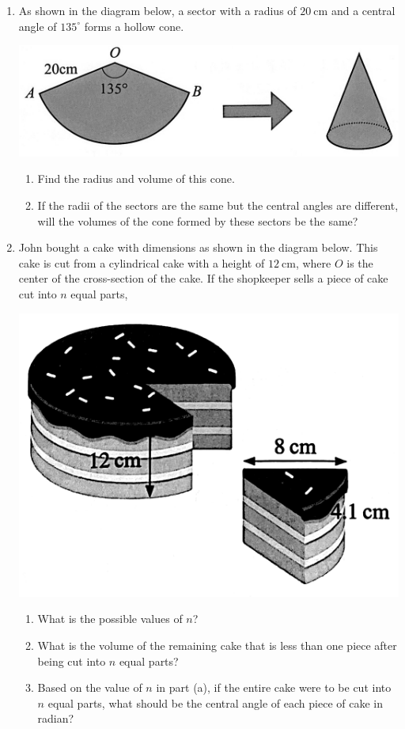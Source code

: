 \documentclass{report}
\begin{document}
\begin{enumerate}
    \newpage
    \item As shown in the diagram below, a sector with a radius of $20 \mathrm{~cm}$ and a central angle of $135^\circ$ forms a hollow cone.
    \begin{center}
        \includegraphics[scale=0.12]{assets/8-34.png}
    \end{center}
    \begin{enumerate}
    \item Find the radius and volume of this cone.
    \item If the radii of the sectors are the same but the central angles are different, will the volumes of the cone formed by these sectors be the same?
    \end{enumerate}
    

    \item John bought a cake with dimensions as shown in the diagram below. This cake is cut from a cylindrical cake with a height of $12 \mathrm{~cm}$, where $O$ is the center of the cross-section of the cake. If the shopkeeper sells a piece of cake cut into $n$ equal parts,
    \begin{center}
        \includegraphics[scale=0.12]{assets/8-35.png}
    \end{center}
    \begin{enumerate}
    \item What is the possible values of $n$?
    \item What is the volume of the remaining cake that is less than one piece after being cut into $n$ equal parts?
    \item Based on the value of $n$ in part (a), if the entire cake were to be cut into $n$ equal parts, what should be the central angle of each piece of cake in radian?
    \end{enumerate}


\end{enumerate}
\end{document}

